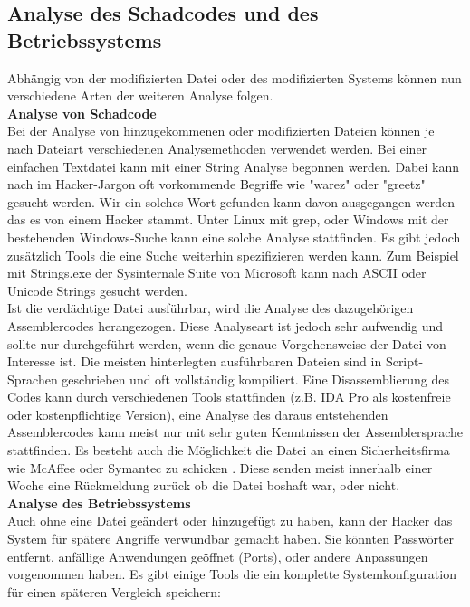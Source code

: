 \subsection{Analyse des Schadcodes und des Betriebssystems}
Abhängig von der modifizierten Datei oder des modifizierten Systems können nun verschiedene Arten der weiteren Analyse folgen.\\

\noindent\textbf{Analyse von Schadcode}\\
\noindent Bei der Analyse von hinzugekommenen oder modifizierten Dateien können je nach Dateiart verschiedenen Analysemethoden verwendet werden. Bei einer einfachen Textdatei kann mit einer String Analyse begonnen werden. Dabei kann nach im Hacker-Jargon oft vorkommende Begriffe wie "warez" oder "greetz" gesucht werden. Wir ein solches Wort gefunden kann davon ausgegangen werden das es von einem Hacker stammt\cite{grimes.2003a}. Unter Linux mit grep, oder Windows mit der bestehenden Windows-Suche kann eine solche Analyse stattfinden. Es gibt jedoch zusätzlich Tools die eine Suche weiterhin spezifizieren werden kann. Zum Beispiel mit Strings.exe der Sysinternale Suite von Microsoft kann nach ASCII oder Unicode Strings gesucht werden. \\

\noindent Ist die verdächtige Datei ausführbar, wird die Analyse des dazugehörigen Assemblercodes herangezogen. Diese Analyseart ist jedoch sehr aufwendig und sollte nur durchgeführt werden, wenn die genaue Vorgehensweise der Datei von Interesse ist. Die meisten hinterlegten ausführbaren Dateien sind in Script-Sprachen geschrieben und oft vollständig kompiliert. Eine Disassemblierung des Codes kann durch verschiedenen Tools stattfinden (z.B. IDA Pro als kostenfreie oder kostenpflichtige Version), eine Analyse des daraus entstehenden Assemblercodes kann meist nur mit sehr guten Kenntnissen der Assemblersprache stattfinden. Es besteht auch die Möglichkeit die Datei an einen Sicherheitsfirma wie McAffee oder Symantec zu schicken \cite{grimes.2003a}. Diese senden meist innerhalb einer Woche eine Rückmeldung zurück ob die Datei boshaft war, oder nicht.\\  

\noindent\textbf{Analyse des Betriebssystems}\\
Auch ohne eine Datei geändert oder hinzugefügt zu haben, kann der Hacker das System für spätere Angriffe verwundbar gemacht haben. Sie könnten Passwörter entfernt, anfällige Anwendungen geöffnet (Ports), oder andere Anpassungen vorgenommen haben. Es gibt einige Tools die ein komplette Systemkonfiguration für einen späteren Vergleich speichern:

